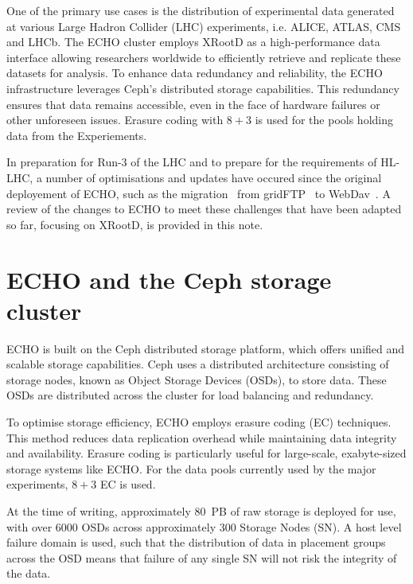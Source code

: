 \documentclass{webofc}
\begin{document}
One of the primary use cases is the distribution of experimental data generated at various Large Hadron Collider (LHC) experiments, i.e. ALICE, ATLAS, CMS and LHCb. The ECHO cluster employs XRootD as a high-performance data interface allowing researchers worldwide to efficiently retrieve and replicate these datasets for analysis.
To enhance data redundancy and reliability, the ECHO infrastructure leverages Ceph's distributed storage capabilities. This redundancy ensures that data remains accessible, even in the face of hardware failures or other unforeseen issues. Erasure coding with $8+3$ is used for the pools holding data from the Experiements. 

In preparation for Run-3 of the LHC and to prepare for the requirements of HL-LHC, a number of optimisations and updates have occured since the original deployement of ECHO, such as the migration~\cite{Bockelman_2020} from gridFTP~\cite{allcock2001gridftp} to WebDav~\cite{webdav}. 
A review of the changes to ECHO to meet these challenges that have been adapted so far, focusing on XRootD, is provided in this note. 

\section{ECHO and the Ceph storage cluster\label{ceph}}
ECHO is built on the Ceph distributed storage platform, which offers unified and scalable storage capabilities. Ceph uses a distributed architecture consisting of storage nodes, known as Object Storage Devices (OSDs), to store data. These OSDs are distributed across the cluster for load balancing and redundancy. 

To optimise storage efficiency, ECHO employs erasure coding (EC) techniques. This method reduces data replication overhead while maintaining data integrity and availability. Erasure coding is particularly useful for large-scale, exabyte-sized storage systems like ECHO. For the data pools currently used by the major experiments, $8+3$ EC is used. 

At the time of writing, approximately $80$~PB of raw storage is deployed for use, with over 6000 OSDs across approximately 300 Storage Nodes (SN). 
A host level failure domain is used, such that the distribution of data in placement groups across the OSD means that failure of any single SN will not risk the integrity of the data. 
\end{document}
